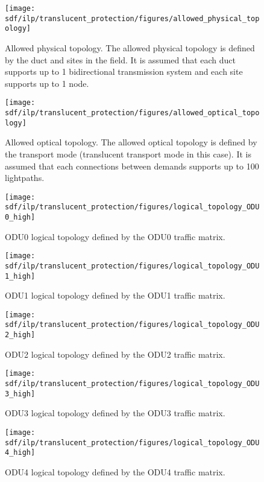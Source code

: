 \begin{figure}[h!]
\centering
\texttt{[image: sdf/ilp/translucent\_protection/figures/allowed\_physical\_topology]}
\caption{Allowed physical topology. The allowed physical topology is defined by the duct and sites in the field. It is assumed that each duct supports up to 1 bidirectional transmission system and each site supports up to 1 node.}
\label{allowed3_physical_protectionhigh}
\end{figure}
\newpage
\begin{figure}[h!]
\centering
\texttt{[image: sdf/ilp/translucent\_protection/figures/allowed\_optical\_topology]}
\caption{Allowed optical topology. The allowed optical topology is defined by the transport mode (translucent transport mode in this case). It is assumed that each connections between demands supports up to 100 lightpaths.}
\label{allowed3_optical_protectionhigh}
\end{figure}

\begin{figure}[h!]
\centering
\texttt{[image: sdf/ilp/translucent\_protection/figures/logical\_topology\_ODU0\_high]}
\caption{ODU0 logical topology defined by the ODU0 traffic matrix.}
\label{logical3_ODU0_protectionhigh}
\end{figure}

\begin{figure}[h!]
\centering
\texttt{[image: sdf/ilp/translucent\_protection/figures/logical\_topology\_ODU1\_high]}
\caption{ODU1 logical topology defined by the ODU1 traffic matrix.}
\label{logical3_ODU1_protectionhigh}
\end{figure}
\newpage
\begin{figure}[h!]
\centering
\texttt{[image: sdf/ilp/translucent\_protection/figures/logical\_topology\_ODU2\_high]}
\caption{ODU2 logical topology defined by the ODU2 traffic matrix.}
\label{logical3_ODU2_protectionhigh}
\end{figure}

\begin{figure}[h!]
\centering
\texttt{[image: sdf/ilp/translucent\_protection/figures/logical\_topology\_ODU3\_high]}
\caption{ODU3 logical topology defined by the ODU3 traffic matrix.}
\label{logical3_ODU3_protectionhigh}
\end{figure}

\begin{figure}[h!]
\centering
\texttt{[image: sdf/ilp/translucent\_protection/figures/logical\_topology\_ODU4\_high]}
\caption{ODU4 logical topology defined by the ODU4 traffic matrix.}
\label{logical3_ODU4_protectionhigh}
\end{figure}
